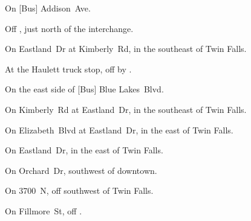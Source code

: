 
\begin{LocationList}

On  [Bus] Addison~Ave.

Off , just north of the  interchange.

\Location{\GarageHQ \Garage}
On Eastland~Dr at Kimberly~Rd, in the southeast of Twin Falls.

At the Haulett truck stop, off  by  .

On the east side of [Bus] Blue Lakes~Blvd.

On Kimberly~Rd at Eastland~Dr, in the southeast of Twin Falls.

On Elizabeth~Blvd at Eastland~Dr, in the east of Twin Falls.

\Location{\RecruitmentAgency \Recruitment}
On Eastland~Dr, in the east of Twin Falls.

On Orchard~Dr, southwest of downtown.

On 3700~N, off  southwest of Twin Falls.

On Fillmore~St, off .

\end{LocationList}
